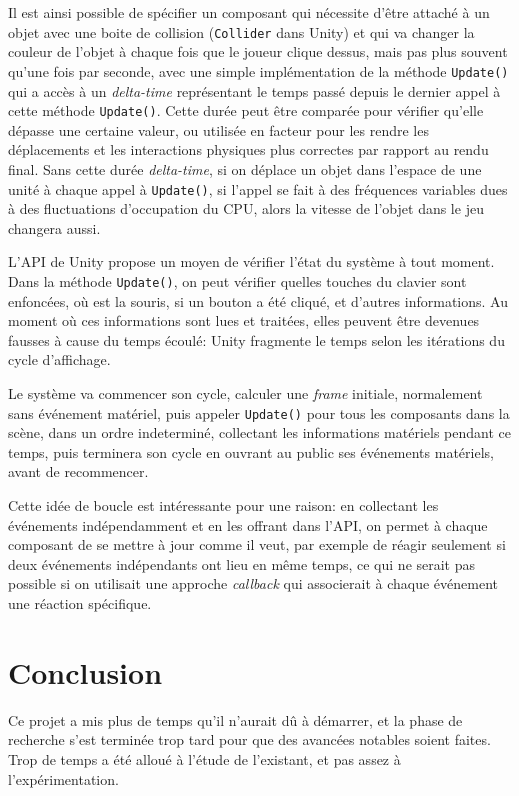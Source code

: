 \documentclass{report}
\begin{document}
Il est ainsi possible de spécifier un composant qui nécessite d'être attaché à
un objet avec une boite de collision (\lstinline|Collider| dans Unity) et qui va
changer la couleur de l'objet à chaque fois que le joueur clique dessus, mais
pas plus souvent qu'une fois par seconde, avec
une simple implémentation de la méthode \lstinline|Update()| qui a accès à un
\emph{delta-time} représentant le temps passé depuis le dernier appel à cette
méthode \lstinline|Update()|.
Cette durée peut être comparée pour vérifier qu'elle dépasse une certaine
valeur, ou utilisée en facteur pour les rendre les déplacements et les
interactions physiques plus correctes par rapport au rendu final.
Sans cette durée \emph{delta-time}, si on déplace un objet dans l'espace de une
unité à chaque appel à \lstinline|Update()|, si l'appel se fait à des fréquences
variables dues à des fluctuations d'occupation du CPU, alors la vitesse de
l'objet dans le jeu changera aussi.

L'API de Unity propose un moyen de vérifier l'état du système à tout moment.
Dans la méthode \lstinline|Update()|, on peut vérifier quelles touches du clavier
sont enfoncées, où est la souris, si un bouton a été cliqué, et d'autres
informations. Au moment où ces informations sont lues et traitées, elles peuvent
être devenues fausses à cause du temps écoulé: Unity fragmente le temps selon
les itérations du cycle d'affichage.

Le système va commencer son cycle, calculer une \emph{frame} initiale, normalement sans
événement matériel, puis appeler \lstinline|Update()| pour tous les composants
dans la scène, dans un ordre indeterminé, collectant les informations
matériels pendant ce temps, puis terminera son cycle en ouvrant au \og
public\fg{} ses événements matériels, avant de recommencer.

Cette idée de boucle est intéressante pour une raison: en collectant les
événements indépendamment et en les offrant dans l'API, on permet à chaque
composant de se mettre à jour comme il veut, par exemple de réagir seulement si
deux événements indépendants ont lieu en même temps, ce qui ne serait pas
possible si on utilisait une approche \og \emph{callback}\fg{} qui associerait à
chaque événement une réaction spécifique.

\chapter{Conclusion}

Ce projet a mis plus de temps qu'il n'aurait dû à démarrer, et la phase de
recherche s'est terminée trop tard pour que des avancées notables soient faites.
Trop de temps a été alloué à l'étude de l'existant, et pas assez à
l'expérimentation.
\end{document}
